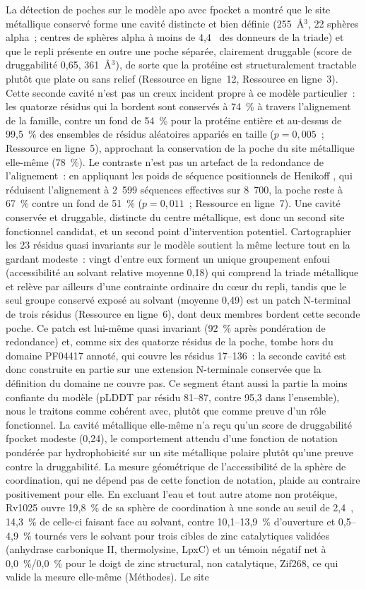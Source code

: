 \documentclass[11pt,a4paper]{article}
\newcommand{\ang}{\text{\AA}}
\begin{document}
La détection de poches sur le modèle apo avec fpocket a montré que le site métallique conservé forme une cavité distincte et bien définie (255~\AA$^3$, 22 sphères alpha~; centres de sphères alpha à moins de 4,4~\ang{} des donneurs de la triade) et que le repli présente en outre une poche séparée, clairement druggable (score de druggabilité 0,65, 361~\AA$^3$), de sorte que la protéine est structuralement tractable plutôt que plate ou sans relief (Ressource en ligne~12, Ressource en ligne~3). Cette seconde cavité n'est pas un creux incident propre à ce modèle particulier~: les quatorze résidus qui la bordent sont conservés à 74~\% à travers l'alignement de la famille, contre un fond de 54~\% pour la protéine entière et au-dessus de 99,5~\% des ensembles de résidus aléatoires appariés en taille ($p=0,005$~; Ressource en ligne~5), approchant la conservation de la poche du site métallique elle-même (78~\%). Le contraste n'est pas un artefact de la redondance de l'alignement~: en appliquant les poids de séquence positionnels de Henikoff \citep{henikoff1994weights}, qui réduisent l'alignement à 2~599 séquences effectives sur 8~700, la poche reste à 67~\% contre un fond de 51~\% ($p=0,011$~; Ressource en ligne~7). Une cavité conservée et druggable, distincte du centre métallique, est donc un second site fonctionnel candidat, et un second point d'intervention potentiel. Cartographier les 23 résidus quasi invariants sur le modèle soutient la même lecture tout en la gardant modeste~: vingt d'entre eux forment un unique groupement enfoui (accessibilité au solvant relative moyenne 0,18) qui comprend la triade métallique et relève par ailleurs d'une contrainte ordinaire du cœur du repli, tandis que le seul groupe conservé exposé au solvant (moyenne 0,49) est un patch N-terminal de trois résidus (Ressource en ligne~6), dont deux membres bordent cette seconde poche. Ce patch est lui-même quasi invariant (92~\% après pondération de redondance) et, comme six des quatorze résidus de la poche, tombe hors du domaine PF04417 annoté, qui couvre les résidus 17--136~: la seconde cavité est donc construite en partie sur une extension N-terminale conservée que la définition du domaine ne couvre pas. Ce segment étant aussi la partie la moins confiante du modèle (pLDDT par résidu 81--87, contre 95,3 dans l'ensemble), nous le traitons comme cohérent avec, plutôt que comme preuve d'un rôle fonctionnel. La cavité métallique elle-même n'a reçu qu'un score de druggabilité fpocket modeste (0,24), le comportement attendu d'une fonction de notation pondérée par hydrophobicité sur un site métallique polaire plutôt qu'une preuve contre la druggabilité. La mesure géométrique de l'accessibilité de la sphère de coordination, qui ne dépend pas de cette fonction de notation, plaide au contraire positivement pour elle. En excluant l'eau et tout autre atome non protéique, Rv1025 ouvre 19,8~\% de sa sphère de coordination à une sonde au seuil de 2,4~\ang{}, 14,3~\% de celle-ci faisant face au solvant, contre 10,1--13,9~\% d'ouverture et 0,5--4,9~\% tournés vers le solvant pour trois cibles de zinc catalytiques validées (anhydrase carbonique II, thermolysine, LpxC) et un témoin négatif net à 0,0~\%/0,0~\% pour le doigt de zinc structural, non catalytique, Zif268, ce qui valide la mesure elle-même (Méthodes). Le site 
\end{document}
